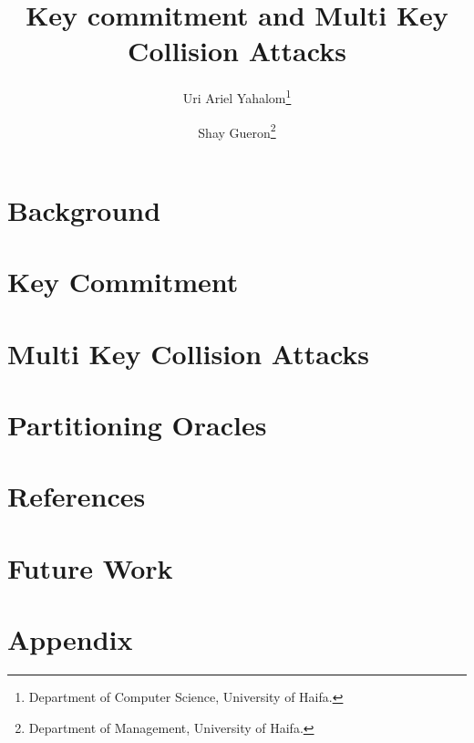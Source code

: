 \documentclass[12pt]{article}
\title{Key commitment and Multi Key Collision Attacks}
\author{Uri Ariel Yahalom\thanks{Department of Computer Science, University of Haifa.}
\and Shay Gueron\thanks{Department of Management, University of Haifa.}}
\date{}
\begin{document}
    
    \newpage


    \section{Background}\label{sec:background}
    
    \newpage


    \section{Key Commitment}\label{sec:key-commitment}
    
    \newpage


    \section{Multi Key Collision Attacks}\label{sec:multi-key-collision-attacks}
    
    \newpage


    \section{Partitioning Oracles}\label{sec:partitioning-oracles}
    
    \newpage

    \section*{References}
    
    \newpage

    \section*{Future Work}
    
    \newpage

    \section*{Appendix}
    
    \newpage
\end{document}
